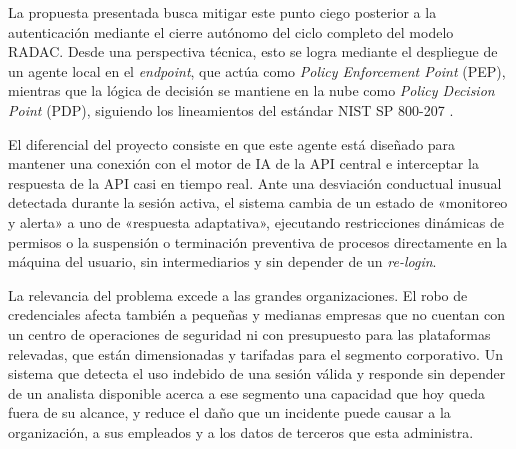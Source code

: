 La propuesta presentada busca mitigar este punto ciego posterior a la autenticación mediante el cierre autónomo del ciclo completo del modelo RADAC. Desde una perspectiva técnica, esto se logra mediante el despliegue de un agente local en el \emph{endpoint}, que actúa como \emph{Policy Enforcement Point} (PEP), mientras que la lógica de decisión se mantiene en la nube como \emph{Policy Decision Point} (PDP), siguiendo los lineamientos del estándar NIST SP 800-207 \parencite{Rose2020}.

El diferencial del proyecto consiste en que este agente está diseñado para mantener una conexión con el motor de IA de la API central e interceptar la respuesta de la API casi en tiempo real. Ante una desviación conductual inusual detectada durante la sesión activa, el sistema cambia de un estado de «monitoreo y alerta» a uno de «respuesta adaptativa», ejecutando restricciones dinámicas de permisos o la suspensión o terminación preventiva de procesos directamente en la máquina del usuario, sin intermediarios y sin depender de un \emph{re-login}.

La relevancia del problema excede a las grandes organizaciones. El robo de credenciales afecta
también a pequeñas y medianas empresas que no cuentan con un centro de operaciones de seguridad
ni con presupuesto para las plataformas relevadas, que están dimensionadas y tarifadas para el
segmento corporativo. Un sistema que detecta el uso indebido de una sesión válida y responde sin
depender de un analista disponible acerca a ese segmento una capacidad que hoy queda fuera de su
alcance, y reduce el daño que un incidente puede causar a la organización, a sus empleados y a los
datos de terceros que esta administra.


